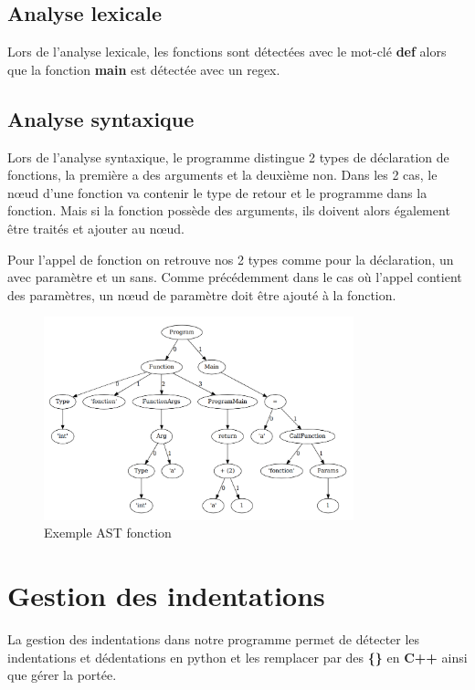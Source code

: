 \subsection*{Analyse lexicale}

Lors de l'analyse lexicale, les fonctions sont détectées avec le mot-clé \textbf{def} alors que la fonction \textbf{main} est
détectée avec un regex.

\subsection*{Analyse syntaxique}

Lors de l'analyse syntaxique, le programme distingue 2 types de déclaration de fonctions, la première a des arguments et la deuxième non.
Dans les 2 cas, le nœud d'une fonction va contenir le type de retour et le programme dans la fonction.
Mais si la fonction possède des arguments, ils doivent alors également être traités et ajouter au nœud.

Pour l'appel de fonction on retrouve nos 2 types comme pour la déclaration, un avec paramètre et un sans.
Comme précédemment dans le cas où l'appel contient des paramètres, un nœud de paramètre doit être ajouté à la fonction.


\begin{figure}[h]
    \centering
    \includegraphics[width=0.8\textwidth]{./images/exemple_ast_fonction.png}
    \caption{Exemple AST fonction}\label{exemple_fonction}
\end{figure}

\section{Gestion des indentations}

La gestion des indentations dans notre programme permet de détecter les indentations et dédentations en python et les remplacer par des \textbf{\{\}} en \textbf{C++}
ainsi que gérer la portée.

